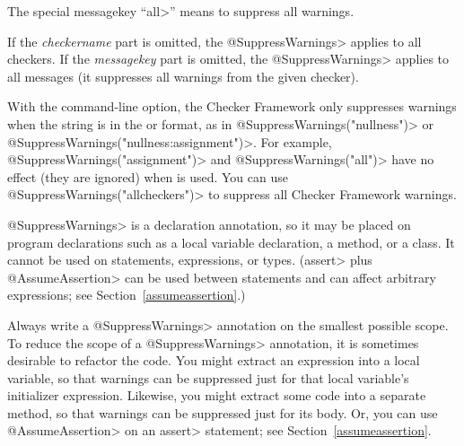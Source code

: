 The special messagekey ``\<all>'' means to suppress all warnings.

If the \emph{checkername} part is omitted, the \<@SuppressWarnings> applies
to all checkers.
If the \emph{messagekey} part is omitted, the \<@SuppressWarnings> applies
to all messages (it suppresses all warnings from the given checker).

With the  command-line
option, the Checker Framework only suppresses warnings when the string is in
the  or 
format, as in
\<@SuppressWarnings("nullness")> or
\<@SuppressWarnings("nullness:assignment")>.
For example, \<@SuppressWarnings("assignment")> and
\<@SuppressWarnings("all")> have no effect (they are ignored) when
 is used.  You can use
\<@SuppressWarnings("allcheckers")> to suppress all Checker Framework
warnings.

%



\<@SuppressWarnings> is a declaration annotation, so it may be placed on
program declarations such as a local variable declaration, a method, or a
class.  It cannot be used on statements, expressions, or types.
(\<assert> plus \<@AssumeAssertion> can be used between statements and can
affect arbitrary expressions; see Section~\ref{assumeassertion}.)

Always write a \<@SuppressWarnings> annotation on the smallest possible
scope.  To reduce the scope of a \<@SuppressWarnings> annotation, it is
sometimes desirable to refactor the code.  You might extract an expression
into a local variable, so that warnings can be suppressed just for that
local variable's initializer expression.  Likewise, you might extract some
code into a separate method, so that warnings can be suppressed just for
its body.  Or, you can use \<@AssumeAssertion> on an \<assert> statement;
see Section~\ref{assumeassertion}.

